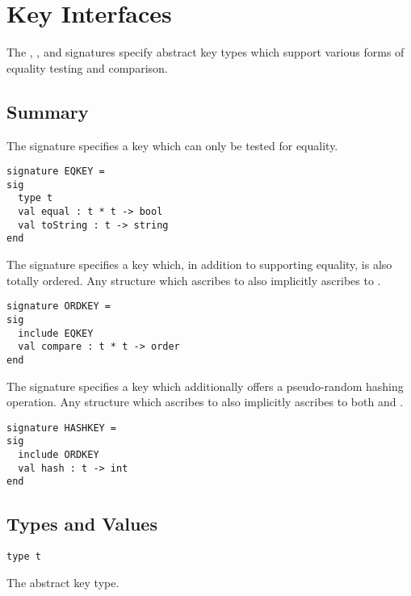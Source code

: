 \chapter{Key Interfaces}
\label{ch:key-interface}
\begin{preamble}
The , , and  signatures specify abstract
key types which support various forms of equality testing and comparison.
\end{preamble}

\section{Summary}

\begin{gram}
The  signature specifies a key which can only be tested for
equality.
\begin{verbatim}
signature EQKEY =
sig
  type t
  val equal : t * t -> bool
  val toString : t -> string
end
\end{verbatim}
\end{gram}

\begin{gram}
The  signature specifies a key which, in addition to supporting
equality, is also totally ordered. Any structure which ascribes to 
also implicitly ascribes to .
\begin{verbatim}
signature ORDKEY =
sig
  include EQKEY
  val compare : t * t -> order
end
\end{verbatim}
\end{gram}

\begin{gram}
The  signature specifies a key which additionally offers a
pseudo-random hashing operation. Any structure which ascribes to 
also implicitly ascribes to both  and .
\begin{verbatim}
signature HASHKEY =
sig
  include ORDKEY
  val hash : t -> int
end
\end{verbatim}
\end{gram}

\section{Types and Values}

\begin{gram}
\begin{verbatim}
type t
\end{verbatim}
The abstract key type.
\end{gram}

